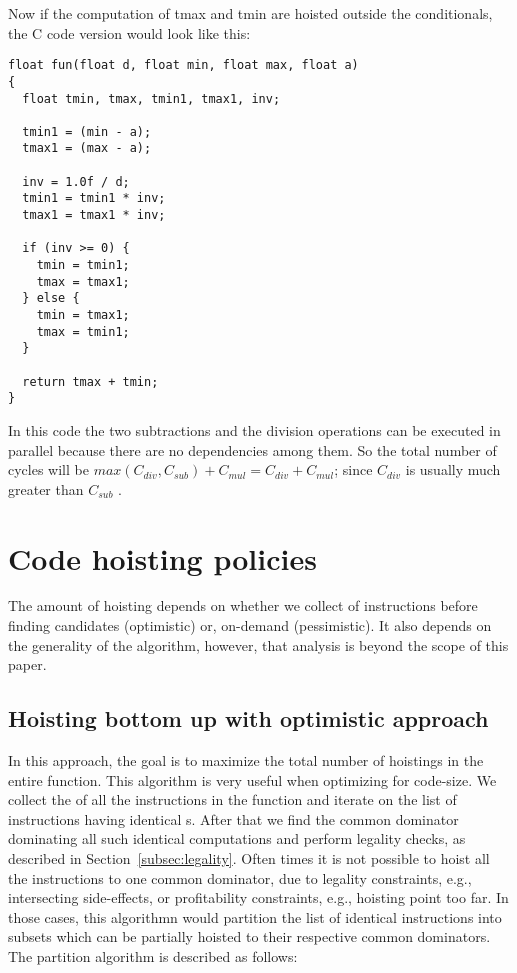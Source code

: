 \documentclass{sig-alternate}
\begin{document}
Now if the computation of tmax and tmin are hoisted outside the
conditionals, the C code version would look like this:
\begin{verbatim}
float fun(float d, float min, float max, float a)
{
  float tmin, tmax, tmin1, tmax1, inv;

  tmin1 = (min - a);
  tmax1 = (max - a);

  inv = 1.0f / d;
  tmin1 = tmin1 * inv;
  tmax1 = tmax1 * inv;

  if (inv >= 0) {
    tmin = tmin1;
    tmax = tmax1;
  } else {
    tmin = tmax1;
    tmax = tmin1;
  }

  return tmax + tmin;
}

\end{verbatim}

In this code the two subtractions and the division operations can be executed in
parallel because there are no dependencies among them. So the total number of
cycles will be $max(C_{div}, C_{sub}) + C_{mul} = C_{div} + C_{mul}$; since $C_{div}$ is
usually much greater than $C_{sub}$ \cite{x86,aarch64}.


\newpage

\section{Code hoisting policies}
The amount of hoisting depends on whether we collect \GVN{} of instructions
before finding candidates (optimistic) or, on-demand (pessimistic). It also
depends on the generality of the \GVN{} algorithm, however, that analysis is beyond
the scope of this paper.

\subsection{Hoisting bottom up with optimistic approach}
\label{subsec:optimistic}
In this approach, the goal is to maximize the total number of hoistings in the
entire function.  This algorithm is very useful when optimizing for code-size.
We collect the \GVN{} of all the instructions in the function and iterate on the
list of instructions having identical \GVN{}s. After that we find the common
dominator dominating all such identical computations and perform legality
checks, as described in Section~\ref{subsec:legality}. Often times it is not
possible to hoist all the instructions to one common dominator, due to legality
constraints, e.g., intersecting side-effects, or profitability constraints, e.g.,
hoisting point too far. In those cases, this algorithmn would partition the list
of identical instructions into subsets which can be partially hoisted to their
respective common dominators. The partition algorithm is described as follows:
\end{document}
